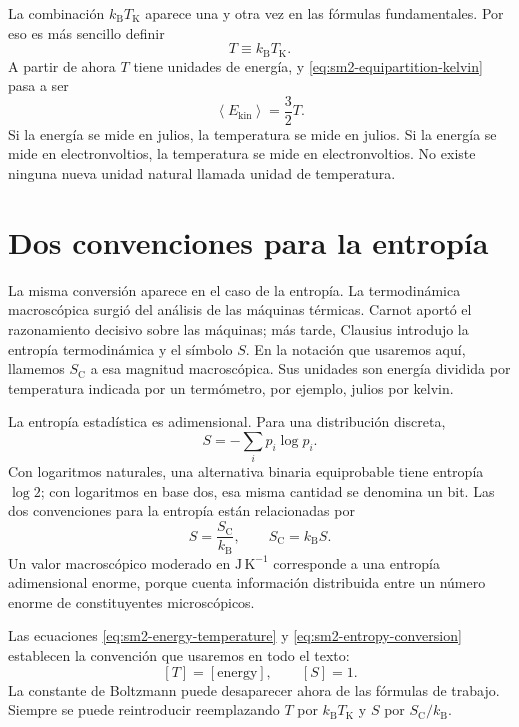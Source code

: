 La combinación \(k_{\mathrm B}T_{\mathrm K}\) aparece una y otra vez en las fórmulas fundamentales. Por eso es más sencillo definir
\begin{equation}
 T\equiv k_{\mathrm B}T_{\mathrm K}.
 \label{eq:sm2-energy-temperature}
\end{equation}
A partir de ahora \(T\) tiene unidades de energía, y \eqref{eq:sm2-equipartition-kelvin} pasa a ser
\begin{equation}
 \left\langle E_{\mathrm{kin}}\right\rangle=\frac{3}{2}T.
 \label{eq:sm2-equipartition-natural}
\end{equation}
Si la energía se mide en julios, la temperatura se mide en julios. Si la energía se mide en electronvoltios, la temperatura se mide en electronvoltios. No existe ninguna nueva unidad natural llamada unidad de temperatura.

\section{Dos convenciones para la entropía}

La misma conversión aparece en el caso de la entropía. La termodinámica macroscópica surgió del análisis de las máquinas térmicas. Carnot aportó el razonamiento decisivo sobre las máquinas; más tarde, Clausius introdujo la entropía termodinámica y el símbolo \(S\). En la notación que usaremos aquí, llamemos \(S_{\mathrm C}\) a esa magnitud macroscópica. Sus unidades son energía dividida por temperatura indicada por un termómetro, por ejemplo, julios por kelvin.

La entropía estadística es adimensional. Para una distribución discreta,
\begin{equation}
 S=-\sum_i p_i\log p_i.
 \label{eq:sm2-statistical-entropy}
\end{equation}
Con logaritmos naturales, una alternativa binaria equiprobable tiene entropía \(\log2\); con logaritmos en base dos, esa misma cantidad se denomina un bit. Las dos convenciones para la entropía están relacionadas por
\begin{equation}
 S=\frac{S_{\mathrm C}}{k_{\mathrm B}},
 \qquad
 S_{\mathrm C}=k_{\mathrm B}S.
 \label{eq:sm2-entropy-conversion}
\end{equation}
Un valor macroscópico moderado en \(\mathrm{J\,K^{-1}}\) corresponde a una entropía adimensional enorme, porque cuenta información distribuida entre un número enorme de constituyentes microscópicos.

Las ecuaciones \eqref{eq:sm2-energy-temperature} y \eqref{eq:sm2-entropy-conversion} establecen la convención que usaremos en todo el texto:
\[
 [T]=[\text{energy}],
 \qquad
 [S]=1.
\]
La constante de Boltzmann puede desaparecer ahora de las fórmulas de trabajo. Siempre se puede reintroducir reemplazando \(T\) por \(k_{\mathrm B}T_{\mathrm K}\) y \(S\) por \(S_{\mathrm C}/k_{\mathrm B}\).

